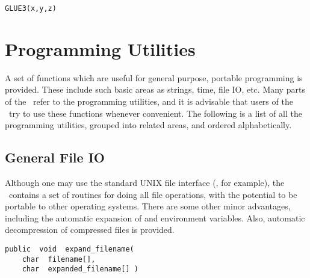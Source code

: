 
{\bf\begin{verbatim}
GLUE3(x,y,z)
\end{verbatim}}


\chapter{Programming Utilities}

A set of functions which are useful for general purpose, portable
programming is provided.  These include such basic areas as strings,
time, file IO, etc.  Many parts of the \vol\  refer
to the programming utilities, and it is advisable that users of the
\vol\  try to use these functions whenever convenient.
The following is a list of all the programming utilities, grouped into
related areas, and ordered alphabetically.

\section{General File IO}

Although one may use the standard UNIX file interface (,
for example), the \vol\  contains a set of routines for
doing all file operations, with the potential to be portable to
other operating systems.  There are some other minor advantages,
including the automatic expansion of \name{\~\ } and environment
variables.  Also, automatic decompression of compressed files is
provided.

{\bf\begin{verbatim}
public  void  expand_filename(
    char  filename[],
    char  expanded_filename[] )
\end{verbatim}}


